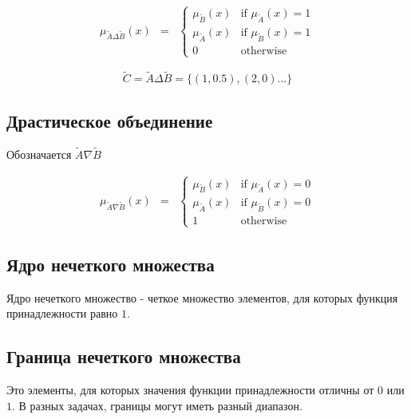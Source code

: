 			\begin{equation}
				\begin{matrix}
					\mu_{\tilde A \Delta \tilde B}(x) & =
					& \left\{
					\begin{matrix}
						\mu_{\tilde B}(x) & \mbox{if } \mu_{\tilde A }(x) = 1\\
						\mu_{\tilde A}(x) & \mbox{if } \mu_{\tilde B }(x) = 1\\
						0 & \mbox{otherwise }
					\end{matrix} \right.
				\end{matrix}
			\end{equation}
			
			\[\tilde C = \tilde A \Delta \tilde B = \{(1, 0.5), (2, 0) ...\}\]
		
		\subsection{Драстическое объединение}
		    Обозначается $\tilde A \nabla \tilde B$
		
			\begin{equation}
		                \begin{matrix}
			                \mu_{\tilde A \nabla \tilde B}(x) & =
			                & \left\{
			                \begin{matrix}
				                \mu_{\tilde B}(x) & \mbox{if } \mu_{\tilde A }(x) = 0\\
				                \mu_{\tilde A}(x) & \mbox{if } \mu_{\tilde B }(x) = 0\\
				                1 & \mbox{otherwise }
			                \end{matrix} \right.
		                \end{matrix}
            		\end{equation}
			
		\subsection{Ядро нечеткого множества}
			Ядро нечеткого множество - четкое множество элементов, для которых функция принадлежности
			равно $1$.
			
		\subsection{Граница нечеткого множества}
			Это элементы, для которых значения функции принадлежности отличны от $0$ или $1$. В разных
			задачах, границы могут иметь разный диапазон.
			

